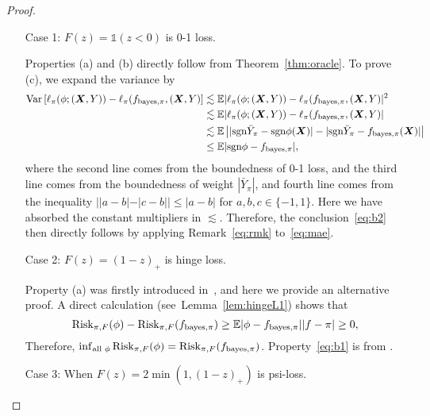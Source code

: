 \documentclass[11pt]{article}
\theoremstyle{plain}
\theoremstyle{definition}
\def\sign{\textup{sgn}}
\def\bayespif{f_{\textup{bayes},\pi}}
\def\shift{\bar Y_\pi}
\def\riskF{\textup{Risk}_{\pi,F}}
\begin{document}
\begin{proof}
\begin{enumerate}[label={2.\arabic*},wide, labelwidth=!, labelindent=0pt]

\item[Case 1:] $F(z)=\mathds{1}(z<0)$ is 0-1 loss. 

Properties (a) and (b) directly follow from Theorem~\ref{thm:oracle}. To prove (c), we expand the variance by
\begin{align}\label{eq:mae}
\textup{Var}\left[\ell_{\pi}(\phi;(\mX,Y))-\ell_{\pi}(\bayespif,(\mX,Y)\right] &\lesssim \mathbb{E}|\ell_{\pi}(\phi;(\mX,Y))-\ell_{\pi}(\bayespif,(\mX,Y)|^2\notag \\
&\lesssim \mathbb{E}|\ell_{\pi}(\phi;(\mX,Y))-\ell_{\pi}(\bayespif,(\mX,Y)|\notag \\
& \lesssim \mathbb{E}\left||\sign \shift - \sign \phi(\mX)|-|\sign \shift -\bayespif(\mX)|\right|\notag\\
&\leq \mathbb{E}|\sign \phi-\bayespif|,
\end{align}
where the second line comes from the boundedness of 0-1 loss, and the third line comes from the boundedness of weight $|\shift|$, and fourth line comes from the inequality $||a-b|-|c-b||\leq |a-b|$ for $a,b,c\in\{-1,1\}$. Here we have absorbed the constant multipliers in $\lesssim$. Therefore, the conclusion~\eqref{eq:b2} then directly follows by applying Remark~\ref{eq:rmk} to~\eqref{eq:mae}. 

\item[Case 2:] $F(z)=(1-z)_{+}$ is hinge loss. 

Property (a) was firstly introduced in~\citet[Lemma 1]{wang2008probability}, and here we provide an alternative proof. A direct calculation (see\ Lemma~\ref{lem:hingeL1}) shows that
\[
\riskF(\phi)-\riskF(\bayespif)\geq \mathbb{E}|\phi-\bayespif||f-\pi|\geq0,
\]
Therefore, $\inf_{\text{all }\phi}\riskF(\phi)=\riskF(\bayespif)$. Property~\eqref{eq:b1} is from \citet[Corollary 1]{scott2011surrogate}.

\item[Case 3:] When $F(z) = 2\min(1,(1-z)_+)$ is psi-loss. 


\end{enumerate}
\end{proof}
\end{document}
